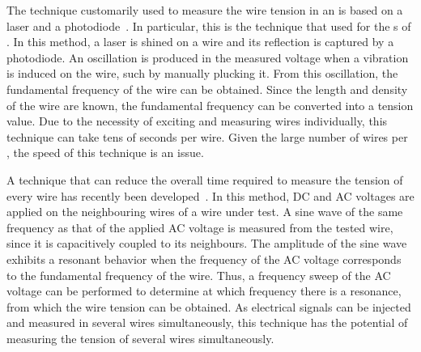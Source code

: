 
The technique customarily used to measure the wire tension in an  is based on a laser and a photodiode~\cite{Acciarri:2016ugk}. In particular, this is the technique that used for the s of . In this method, a laser is shined on a wire and its reflection is captured by a photodiode. An oscillation is produced in the measured voltage when a vibration is induced on the wire, such by manually plucking it. From this oscillation, the fundamental frequency of the wire can be obtained. Since the length and density of the wire are known, the fundamental frequency can be converted into a tension value. Due to the necessity of exciting and measuring wires individually, this technique can take tens of seconds per wire. Given the large number of wires per , the speed of this technique is an issue.

A technique that can reduce the overall time required to measure the tension of every wire has recently been developed~\cite{Garcia-Gamez:2018frz}. In this method, DC and AC voltages are applied on the neighbouring wires of a wire under test. A sine wave of the same frequency as that of the applied AC voltage is measured from the tested wire, since it is capacitively coupled to its neighbours. The amplitude of the sine wave exhibits a resonant behavior when the frequency of the AC voltage corresponds to the fundamental frequency of the wire. Thus, a frequency sweep of the AC voltage can be performed to determine at which frequency there is a resonance, from which the wire tension can be obtained. As electrical signals can be injected and measured in several wires simultaneously, this technique has the potential of measuring the tension of several wires simultaneously.

